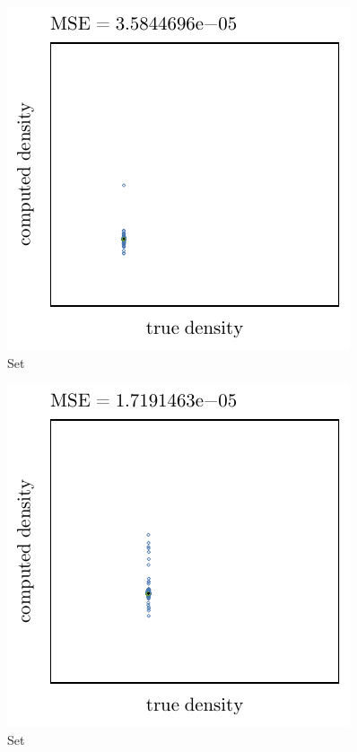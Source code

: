 \begin{subfigure}{0.3\textwidth}
	\centering
	\includegraphics[keepaspectratio=true, width=\textwidth, height=0.23\textheight]{4/img/results_baakman_5_60000_sambe_breiman.pdf}
	\caption{Set \baakmanFive}
	\label{fig:4:simulated:datasets:sambe:baakman5}
\end{subfigure}		
\begin{subfigure}{0.3\textwidth}
	\centering
	\includegraphics[keepaspectratio=true, width=\textwidth, height=0.23\textheight]{4/img/results_baakman_1_60000_sambe_breiman.pdf}
	\caption{Set \baakmanOne}
	\label{fig:4:simulated:datasets:sambe:baakman1}
\end{subfigure}
